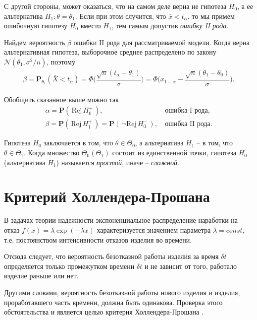 \documentclass[%
	11pt,
	a4paper,
	utf8,
		]{article}
\begin{document}
С другой стороны, может оказаться, что на самом деле верна не гипотеза $ H_0 $, а ее альтернатива $ H_1 : \theta = \theta_1$. Если при этом случится, что $ \bar{x} < t_\alpha $, то мы примем ошибочную гипотезу $ H_0 $ вместо $ H_1 $, тем самым допустив \emph{ошибку II рода}.

Найдем вероятность $ \beta $ ошибки II рода для рассматриваемой модели. Когда верна альтернативная гипотеза, выборочное среднее распределено по закону $ \mathcal{N}(\theta_1, \sigma^2/n)$, поэтому
\begin{align*}
	\beta = \mathbf{P}_{\theta_1}(\bar{X} < t_\alpha) = \Phi \Bigg( \dfrac{ \sqrt{n}(t_\alpha - \theta_1) }{\sigma} \Bigg) = \Phi \Bigg( x_{1 - \alpha} - \dfrac{ \sqrt{n}(\theta_1 - \theta_0) }{\sigma} \Bigg).
\end{align*}

Обобщить сказанное выше можно так
\begin{align*}
	\alpha = \mathbf{P}(\,\text{Rej} \, H_0^+\,),\ &\text{ошибка I рода},\\
	\beta = \mathbf{P}(\,\text{Rej} \, H_1^+\,) = \mathbf{P}(\,\neg\text{Rej} \, H_0^-\,),\ &\text{ошибка II рода}.
\end{align*}

Гипотеза $ H_0 $ заключается в том, что $ \theta \in \Theta_0 $, а альтернатива $ H_1 $ -- в том, что $ \theta \in \Theta_1 $. Когда множество $ \Theta_0 (\Theta_1) $ состоит из единственной точки, гипотеза $ H_0 $ (альтернатива $ H_1 $) называется \emph{простой}, иначе -- \emph{сложной}.


\section{Критерий Холлендера-Прошана}

В задачах теории надежности экспоненциальное распределение наработки на отказ $ f(x) = \lambda \exp(-\lambda x) $ характеризуется значением параметра $ \lambda = const $, т.е. постоянством интенсивности отказов изделия во времени.

Отсюда следует, что вероятность безотказной работы изделия за время $ \delta t $ определяется только промежутком времени $ \delta t $ и не зависит от того, работало изделие раньше или нет.

Другими словами, вероятность безотказной работы нового изделия и изделия, проработавшего часть времени, должна быть одинакова. Проверка этого обстоятельства и является целью критерия Холлендера-Прошана \cite[295]{kobzar:2012}.
\end{document}
